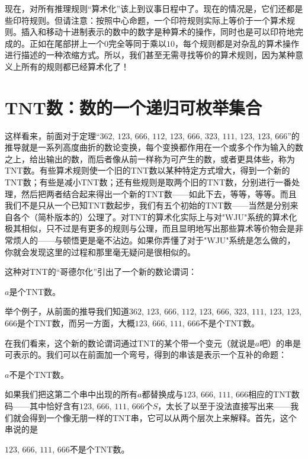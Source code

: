 现在，对所有推理规则“算术化”该上到议事日程中了。现在的情况是，它们还都是些印符规则。但请注意：按照中心命题，一个印符规则实际上等价于一个算术规则。插入和移动十进制表示的数中的数字是种算术的操作，同时也是可以印符地完成的。正如在尾部拼上一个$0$完全等同于乘以$10$，每个规则都是对杂乱的算术操作进行描述的一种浓缩方式。所以，我们甚至无需寻找等价的算术规则，因为某种意义上所有的规则都已经算术化了！

\section{TNT数：数的一个递归可枚举集合}

这样看来，前面对于定理“$362$, $123$, $666$, $112$, $123$, $666$, $323$, $111$, $123$, $123$, $666$”的推导就是一系列高度曲折的数论变换，每个变换都作用在一个或多个作为输入的数之上，给出输出的数，而后者像从前一样称为可产生的数，或者更具体些，称为TNT数。有些算术规则使一个旧的TNT数以某种特定方式增大，得到一个新的TNT数；有些是减小TNT数；还有些规则是取两个旧的TNT数，分别进行一番处理，然后把两者结合起来得出一个新的TNT数——如此下去，等等，等等。而且我们不是只从一个已知TNT数起步，我们有五个初始的TNT数——当然是分别来自各个（简朴版本的）公理了。对TNT的算术化实际上与对"WJU"系统的算术化极其相似，只不过是有更多的规则与公理，而且显明地写出那些算术等价物会是非常烦人的——与顿悟更是毫不沾边。如果你弄懂了对于"WJU"系统是怎么做的，你就会发现这里的过程和那里毫无疑问是很相似的。

这种对TNT的“哥德尔化”引出了一个新的数论谓词：

\begin{block}
$a$是个TNT数。
\end{block}

举个例子，从前面的推导我们知道$362$, $123$, $666$, $112$, $123$, $666$, $323$, $111$, $123$, $123$, $666$是个TNT数，而另一方面，大概$123$, $666$, $111$, $666$不是个TNT数。

在我们看来，这个新的数论谓词通过TNT的某个带一个变元（就说是$a$吧）的串是可表示的。我们可以在前面加一个弯号，得到的串该是表示一个互补的命题：

\begin{block}
$a$不是个TNT数。
\end{block}

如果我们把这第二个串中出现的所有$a$都替换成与$123$, $666$, $111$, $666$相应的TNT数码——其中恰好含有$123$, $666$, $111$, $666$个$S$，太长了以至于没法直接写出来——我们就会得到一个像无朋一样的TNT串，它可以从两个层次上来解释。首先，这个串说的是

\begin{block}
$123$, $666$, $111$, $666$不是个TNT数。
\end{block}

